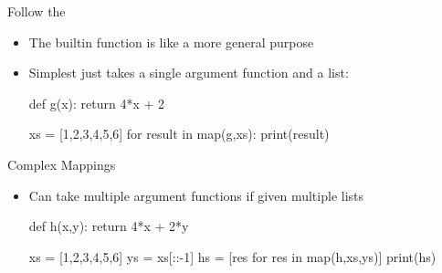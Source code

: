 \documentclass[pdf, aspectratio=169, 12pt]{beamer}
\begin{document}
\begin{frame}[fragile]{Follow the }
	\vspace{5mm}
	\begin{itemize}
		\item The builtin  function is like a more general purpose 
		\item Simplest just takes a single argument function and a list:
			\begin{pythoncode}
				def g(x):
					return 4*x + 2

				xs = [1,2,3,4,5,6]
				for result in map(g,xs):
					print(result)
			\end{pythoncode}
	\end{itemize}
\end{frame}

\begin{frame}[fragile]{Complex Mappings}
	\begin{itemize}
		\item Can take multiple argument functions if given multiple lists
			\begin{pythoncode}
				def h(x,y):
					return 4*x + 2*y

				xs = [1,2,3,4,5,6]
				ys = xs[::-1]
				hs = [res for res in map(h,xs,ys)]
				print(hs)
			\end{pythoncode}
	\end{itemize}
\end{frame}


\end{document}
